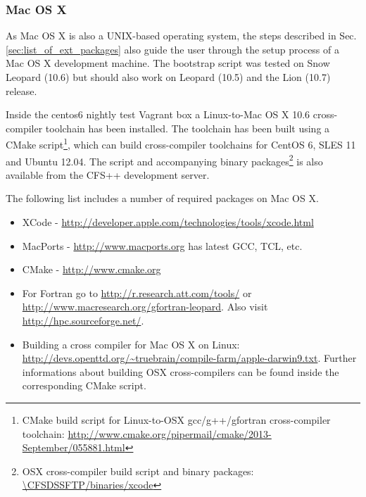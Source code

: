 \subsubsection{Mac OS X}

As Mac OS X is also a UNIX-based operating system, the steps described in Sec.
\ref{sec:list_of_ext_packages} also  guide the user through  the setup process
of a Mac  OS X development machine.   The bootstrap script was  tested on Snow
Leopard (10.6)  but should  also work  on Leopard (10.5)  and the  Lion (10.7)
release.

Inside  the  centos6  nightly  test  Vagrant box  a  Linux-to-Mac  OS  X  10.6
cross-compiler toolchain  has been  installed.  The  toolchain has  been built
using   a   CMake   script\footnote{CMake  build   script   for   Linux-to-OSX
  gcc/g++/gfortran                  cross-compiler                  toolchain:
  \url{http://www.cmake.org/pipermail/cmake/2013-September/055881.html}},
which can  build cross-compiler toolchains  for CentOS  6, SLES 11  and Ubuntu
12.04. The script and accompanying binary packages\footnote{OSX cross-compiler
  build script  and binary  packages: \url{\CFSDSSFTP/binaries/xcode}}  is also
available from the CFS++ development server.

The following list includes a number of required packages on Mac OS X. 
\begin{itemize}
\item XCode - \url{http://developer.apple.com/technologies/tools/xcode.html}
\item MacPorts - \url{http://www.macports.org} has latest GCC, TCL,  etc.
\item CMake - \url{http://www.cmake.org}
\item   For   Fortran    go   to   \url{http://r.research.att.com/tools/}   or
  \url{http://www.macresearch.org/gfortran-leopard}.         Also        visit
  \url{http://hpc.sourceforge.net/}.
\item   Building    a   cross    compiler   for   Mac    OS   X    on   Linux:
  \url{http://devs.openttd.org/~truebrain/compile-farm/apple-darwin9.txt}. Further
  informations  about building  OSX cross-compilers  can be  found inside  the
  corresponding CMake script.
\end{itemize} 


